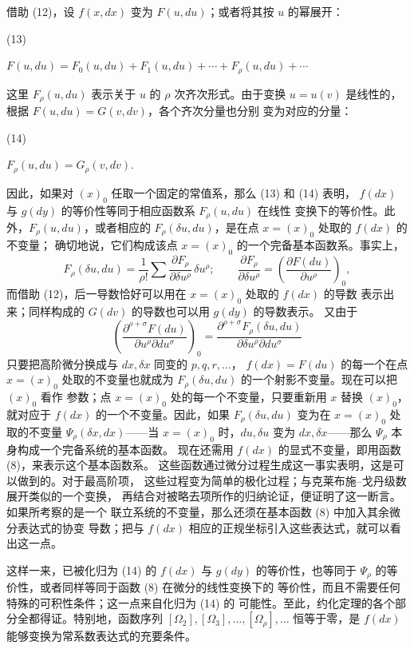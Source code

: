 \documentclass[11pt]{article}
\providecommand{\srcnumdisplay}[3][3.4em]{%
  \par\smallskip\noindent
  \begin{minipage}[t]{#1}\vspace*{0pt}#2\end{minipage}%
  \begin{minipage}[t]{\dimexpr\linewidth-#1\relax}\vspace*{0pt}\centering
  \(\displaystyle #3\)
  \end{minipage}\par\smallskip}
\begin{document}
借助 (12)，设 \(f(x,dx)\) 变为 \(F(u,du)\)；或者将其按 \(u\) 的幂展开：
\srcnumdisplay{(13)}{%
F(u,du)=F_0(u,du)+F_1(u,du)+\cdots+F_\rho(u,du)+\cdots
}
这里 \(F_\rho(u,du)\) 表示关于 \(u\) 的 \(\rho\) 次齐次形式。由于变换
\(u=u(v)\) 是线性的，根据 \(F(u,du)=G(v,dv)\)，各个齐次分量也分别
变为对应的分量：
\srcnumdisplay{(14)}{%
F_\rho(u,du)=G_\rho(v,dv).
}
因此，如果对 \((x)_0\) 任取一个固定的常值系，那么 (13) 和 (14) 表明，
\(f(dx)\) 与 \(g(dy)\) 的等价性等同于相应函数系 \(F_\rho(u,du)\) 在线性
变换下的等价性。此外，\(F_\rho(u,du)\)，或者相应的
\(F_\rho(\delta u,du)\)，是在点 \(x=(x)_0\) 处取的 \(f(dx)\) 的不变量；
确切地说，它们构成该点 \(x=(x)_0\) 的一个完备基本函数系。事实上，
\[
F_\rho(\delta u,du)=\frac1{\rho!}\sum
\frac{\partial F_\rho}{\partial \delta u^\rho}\,\delta u^\rho;
\qquad
\frac{\partial F_\rho}{\partial \delta u^\rho}
=\left(\frac{\partial F(du)}{\partial u^\rho}\right)_0,
\]
而借助 (12)，后一导数恰好可以用在 \(x=(x)_0\) 处取的 \(f(dx)\) 的导数
表示出来；同样构成的 \(G(dv)\) 的导数也可以用 \(g(dy)\) 的导数表示。
又由于
\[
\left(\frac{\partial^{\rho+\sigma}F(du)}
{\partial u^\rho\partial du^\sigma}\right)_0
=
\frac{\partial^{\rho+\sigma}F_\rho(\delta u,du)}
{\partial\delta u^\rho\partial du^\sigma}
\]
只要把高阶微分换成与 \(dx,\delta x\) 同变的 \(p,q,r,\ldots\)，
\(f(dx)=F(du)\) 的每一个在点 \(x=(x)_0\) 处取的不变量也就成为
\(F_\rho(\delta u,du)\) 的一个射影不变量。现在可以把 \((x)_0\) 看作
参数；点 \(x=(x)_0\) 处的每一个不变量，只要重新用 \(x\) 替换
\((x)_0\)，就对应于 \(f(dx)\) 的一个不变量。因此，如果
\(F_\rho(\delta u,du)\) 变为在 \(x=(x)_0\) 处取的不变量
\(\Psi_\rho(\delta x,dx)\)——当 \(x=(x)_0\) 时，\(du,\delta u\) 变为
\(dx,\delta x\)——那么 \(\Psi_\rho\) 本身构成一个完备系统的基本函数。
现在还需用 \(f(dx)\) 的显式不变量，即用函数 (8)，来表示这个基本函数系。
这些函数通过微分过程生成这一事实表明，这是可以做到的。对于最高阶项，
这些过程变为简单的极化过程；与克莱布施--戈丹级数展开类似的一个变换，
再结合对被略去项所作的归纳论证，便证明了这一断言。如果所考察的是一个
联立系统的不变量，那么还须在基本函数 (8) 中加入其余微分表达式的协变
导数；把与 \(f(dx)\) 相应的正规坐标引入这些表达式，就可以看出这一点。

这样一来，已被化归为 (14) 的 \(f(dx)\) 与 \(g(dy)\) 的等价性，也等同于
\(\Psi_\rho\) 的等价性，或者同样等同于函数 (8) 在微分的线性变换下的
等价性，而且不需要任何特殊的可积性条件；这一点来自化归为 (14) 的
可能性。至此，约化定理的各个部分全都得证。特别地，函数序列
\([\Omega_2],[\Omega_3],\ldots,[\Omega_\rho],\ldots\) 恒等于零，是
\(f(dx)\) 能够变换为常系数表达式的充要条件。
\end{document}
